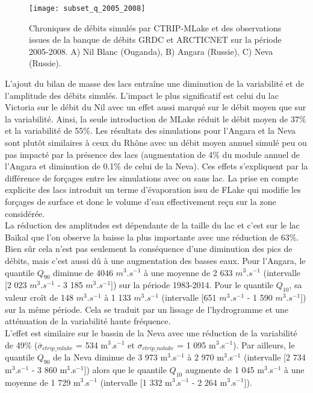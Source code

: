\begin{figure}[h!]
\texttt{[image: subset\_q\_2005\_2008]}
\caption{Chroniques de débits simulés par CTRIP-MLake et des observations issues de la banque de débits GRDC et ARCTICNET sur la période 2005-2008. A) Nil Blanc (Ouganda), B) Angara (Russie), C) Neva (Russie).}
\label{subset_2005_2008}
\end{figure}
\clearpage
L'ajout du bilan de masse des lacs entraîne une diminution de la variabilité et de l'amplitude des débits simulés. L'impact le plus significatif est celui du lac Victoria sur le débit du Nil avec un effet aussi marqué sur le débit moyen que sur la variabilité. Ainsi, la seule introduction de MLake réduit le débit moyen de 37\% et la variabilité de 55\%. Les résultats des simulations pour l'Angara et la Neva sont plutôt similaires à ceux du Rhône avec un débit moyen annuel simulé peu ou pas impacté par la présence des lacs (augmentation de 4\% du module annuel de l'Angara et diminution de 0.1\% de celui de la Neva). Ces effets s'expliquent par la différence de forçages entre les simulations avec ou sans lac. La prise en compte explicite des lacs introduit un terme d'évaporation issu de FLake qui modifie les forçages de surface et donc le volume d'eau effectivement reçu sur la zone considérée.\\



\noindent La réduction des amplitudes est dépendante de la taille du lac et c'est sur le lac Baïkal que l'on observe la baisse la plus importante avec une réduction de 63\%. Bien sûr cela n'est pas seulement la conséquence d'une diminution des pics de débits, mais c'est aussi dû à une augmentation des basses eaux. Pour l'Angara, le quantile $Q_{90}$ diminue de 4046 $m^{3}.s^{-1}$ à une moyenne de 2 633 $m^{3}.s^{-1}$ (intervalle [2 023 $m^{3}.s^{-1}$ - 3 185 $m^{3}.s^{-1}$]) sur la période 1983-2014. Pour le quantile $Q_{10}$, sa valeur croît de 148 $m^{3}.s^{-1}$ à 1 133 $m^{3}.s^{-1}$ (intervalle [651 $m^{3}.s^{-1}$ - 1 590 $m^{3}.s^{-1}$]) sur la même période. Cela se traduit par un lissage de l'hydrogramme et une atténuation de la variabilité haute fréquence. \\
L'effet est similaire sur le bassin de la Neva avec une réduction de la variabilité de 49\% ($\overline{\sigma}_{ctrip\_mlake}$ = 534 m$^{3}$.s$^{-1}$ et $\sigma_{ctrip\_nolake}$ = 1 095 m$^{3}$.s$^{-1}$). Par ailleurs, le quantile $Q_{90}$ de la Neva diminue de 3 973 m$^{3}$.s$^{-1}$ à 2 970 m$^{3}$.s$^{-1}$ (intervalle [2 734 m$^{3}$.s$^{-1}$ - 3 860 m$^{3}$.s$^{-1}$])  alors que le quantile $Q_{10}$ augmente de 1 045 m$^{3}$.s$^{-1}$ à une moyenne de 1 729 m$^{3}$.s$^{-1}$ (intervalle [1 332 m$^{3}$.s$^{-1}$ - 2 264 m$^{3}$.s$^{-1}$]).\\

